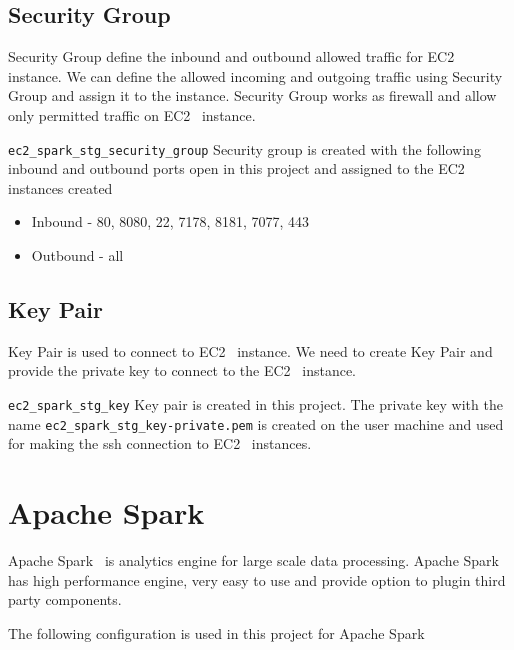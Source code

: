 \subsection{Security Group}

Security Group define the inbound and outbound allowed traffic for
EC2~\cite{hid-sp18-511-www-ec2} instance.  We can define the allowed
incoming and outgoing traffic using Security Group and assign it to
the instance.  Security Group works as firewall and allow only
permitted traffic on EC2~\cite{hid-sp18-511-www-ec2} instance.

\verb|ec2_spark_stg_security_group| Security group is created with the
following inbound and outbound ports open in this project and assigned to the
EC2~\cite{hid-sp18-511-www-ec2} instances created

\begin{itemize}
    \item Inbound - 80, 8080, 22, 7178, 8181, 7077, 443
    \item Outbound - all
	
\end{itemize}

\subsection{Key Pair}

Key Pair is used to connect to EC2~\cite{hid-sp18-511-www-ec2}
instance. We need to create Key Pair and provide the private key to
connect to the EC2~\cite{hid-sp18-511-www-ec2} instance.

\verb|ec2_spark_stg_key| Key pair is created in this project.
The private key with the name \verb|ec2_spark_stg_key-private.pem| is
created on the user machine and used for making the ssh connection to
EC2~\cite{hid-sp18-511-www-ec2} instances.

\section{Apache Spark}

Apache Spark~\cite{hid-sp18-511-www-spark} is analytics engine for
large scale data processing. Apache
Spark~\cite{hid-sp18-511-www-spark} has high performance engine, very
easy to use and provide option to plugin third party components.

The following configuration is used in this project for Apache Spark

